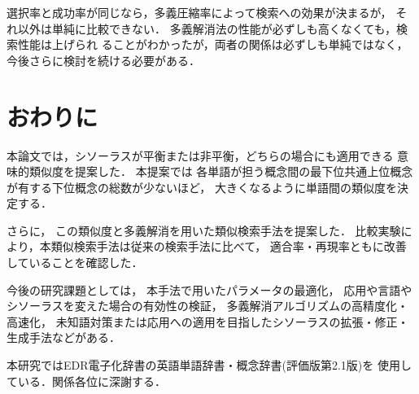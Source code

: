   選択率と成功率が同じなら，多義圧縮率によって検索への効果が決まるが，
  それ以外は単純に比較できない．
  多義解消法の性能が必ずしも高くなくても，検索性能は上げられ
  ることがわかったが，両者の関係は必ずしも単純ではなく，
  今後さらに検討を続ける必要がある．

\section{おわりに}\label{sec:conclusion}
  本論文では，シソーラスが平衡または非平衡，どちらの場合にも適用できる
 意味的類似度を提案した． 本提案では
 各単語が担う概念間の最下位共通上位概念が有する下位概念の総数が少ないほど，
 大きくなるように単語間の類似度を決定する．

 さらに，
 この類似度と多義解消を用いた類似検索手法を提案した．
 比較実験により，本類似検索手法は従来の検索手法に比べて，
 適合率・再現率ともに改善していることを確認した．

 今後の研究課題としては，
   本手法で用いたパラメータの最適化，
   応用や言語やシソーラスを変えた場合の有効性の検証，
   多義解消アルゴリズムの高精度化・高速化，
   未知語対策または応用への適用を目指したシソーラスの拡張・修正・生成手法などがある．


\acknowledgment
本研究ではEDR電子化辞書の英語単語辞書・概念辞書(評価版第2.1版)を
使用している．関係各位に深謝する．





\clearpage

